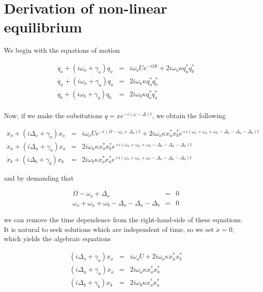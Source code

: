 \section*{Derivation of non-linear equilibrium}\label{section:derivation of non-linear equilibrium}

We begin with the equations of motion

\begin{eqnarray}
\dot{q}_o + (i\omega_o+\gamma_o)q_o & = & i\omega_o U e^{-i\Omega t} + 2i\omega_o \kappa q_a^\ast q_b^\ast \\
\dot{q}_a + (i\omega_a+\gamma_a)q_a & = & 2i\omega_a \kappa q_o^\ast q_b^\ast \\
\dot{q}_b + (i\omega_b+\gamma_b)q_b & = & 2i\omega_b \kappa q_o^\ast q_a^\ast \\
\end{eqnarray}

Now, if we make the subsitutions $q=x e^{-i(\omega-\Delta)t}$, we obtain the following

\begin{eqnarray}
\dot{x}_o + (i\Delta_o+\gamma_o)x_o & = & i\omega_o U e^{-i(\Omega-\omega_o+\Delta_o) t} + 2i\omega_o \kappa x_a^\ast x_b^\ast e^{+i(\omega_o+\omega_a+\omega_b-\Delta_o-\Delta_a-\Delta_b)t} \\
\dot{x}_a + (i\Delta_a+\gamma_a)x_a & = & 2i\omega_a \kappa x_o^\ast x_b^\ast e^{+i(\omega_o+\omega_a+\omega_b-\Delta_o-\Delta_a-\Delta_b)t} \\
\dot{x}_b + (i\Delta_b+\gamma_b)x_b & = & 2i\omega_b \kappa x_o^\ast x_a^\ast e^{+i(\omega_o+\omega_a+\omega_b-\Delta_o-\Delta_a-\Delta_b)t}
\end{eqnarray}

and by demanding that

\begin{eqnarray}
\Omega - \omega_o + \Delta_o & = & 0 \\
\omega_o+\omega_a+\omega_b-\Delta_o-\Delta_a-\Delta_b & = & 0
\end{eqnarray}

we can remove the time dependence from the right-hand-side of these equations. It is natural to seek solutions which are independent of time, so we set $\dot{x}=0$, which yields the algebraic equations

\begin{eqnarray}
(i\Delta_o+\gamma_o)x_o & = & i\omega_o U + 2i\omega_o \kappa x_a^\ast x_b^\ast \\
(i\Delta_a+\gamma_a)x_a & = & 2i\omega_a \kappa x_o^\ast x_b^\ast \\
(i\Delta_b+\gamma_b)x_b & = & 2i\omega_b \kappa x_o^\ast x_a^\ast
\end{eqnarray}

